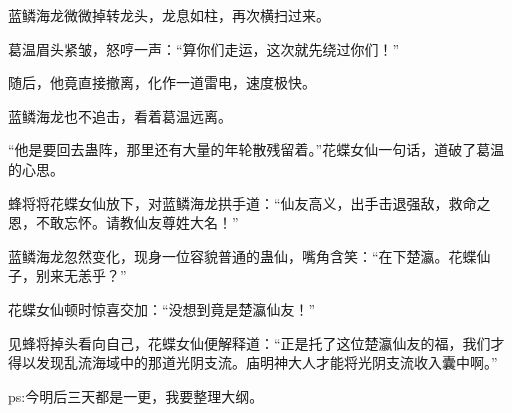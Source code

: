 \begin{this_body}
蓝鳞海龙微微掉转龙头，龙息如柱，再次横扫过来。

葛温眉头紧皱，怒哼一声：“算你们走运，这次就先绕过你们！”

随后，他竟直接撤离，化作一道雷电，速度极快。

蓝鳞海龙也不追击，看着葛温远离。

“他是要回去蛊阵，那里还有大量的年轮散残留着。”花蝶女仙一句话，道破了葛温的心思。

蜂将将花蝶女仙放下，对蓝鳞海龙拱手道：“仙友高义，出手击退强敌，救命之恩，不敢忘怀。请教仙友尊姓大名！”

蓝鳞海龙忽然变化，现身一位容貌普通的蛊仙，嘴角含笑：“在下楚瀛。花蝶仙子，别来无恙乎？”

花蝶女仙顿时惊喜交加：“没想到竟是楚瀛仙友！”

见蜂将掉头看向自己，花蝶女仙便解释道：“正是托了这位楚瀛仙友的福，我们才得以发现乱流海域中的那道光阴支流。庙明神大人才能将光阴支流收入囊中啊。”

ps:今明后三天都是一更，我要整理大纲。

\end{this_body}

